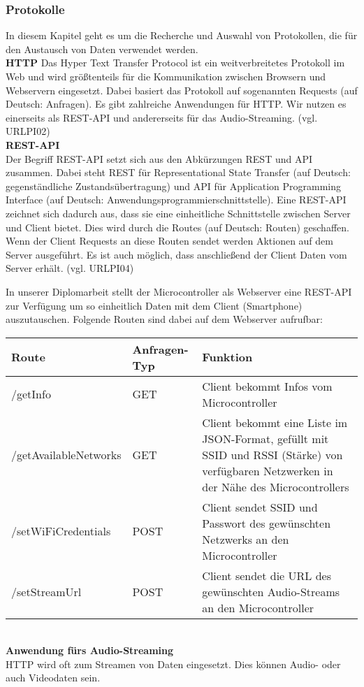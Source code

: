 \documentclass[]{article}
\begin{document}
\subsubsection{Protokolle}
In diesem Kapitel geht es um die Recherche und Auswahl von Protokollen, die für den Austausch von Daten verwendet werden.
\newline \\
\textbf{HTTP}
\newline
Das Hyper Text Transfer Protocol ist ein weitverbreitetes Protokoll im Web und wird größtenteils für die Kommunikation zwischen Browsern und Webservern eingesetzt. Dabei basiert das Protokoll auf sogenannten \glqq Requests\grqq{} (auf Deutsch: Anfragen). Es gibt zahlreiche Anwendungen für HTTP. Wir nutzen es einerseits als REST-API und andererseits für das Audio-Streaming. (vgl. URLPI02) \newline \\
\textbf{REST-API} \\ 
Der Begriff \glqq REST-API\grqq{} setzt sich aus den Abkürzungen \glqq REST\grqq{} und \glqq API\grqq{} zusammen. Dabei steht \glqq REST\grqq{} für \glqq Representational State Transfer\grqq{} (auf Deutsch: \glqq gegenständliche Zustandsübertragung\grqq{}) und \glqq API\grqq{} für \glqq Application Programming Interface\grqq{} (auf Deutsch: \glqq Anwendungsprogrammierschnittstelle\grqq{}). Eine REST-API zeichnet sich dadurch aus, dass sie eine einheitliche Schnittstelle zwischen Server und Client bietet. Dies wird durch die \glqq Routes\grqq{} (auf Deutsch: \glqq Routen\grqq{}) geschaffen. Wenn der Client Requests an diese Routen sendet werden Aktionen auf dem Server ausgeführt. Es ist auch möglich, dass anschließend der Client Daten vom Server erhält. (vgl. URLPI04)

In unserer Diplomarbeit stellt der Microcontroller als Webserver eine REST-API zur Verfügung um so einheitlich Daten mit dem Client (Smartphone) auszutauschen.
Folgende Routen sind dabei auf dem Webserver aufrufbar: \newline

\begin{tabularx}{\textwidth}{|l|l|X|}
\hline
\textbf{Route} & \textbf{Anfragen-Typ} & \textbf{Funktion} \\
\hline
/getInfo & GET & Client bekommt Infos vom Microcontroller \\
\hline 
/getAvailableNetworks & GET & Client bekommt eine Liste im JSON-Format, gefüllt mit SSID und RSSI (Stärke) von verfügbaren Netzwerken in der Nähe des Microcontrollers \\
\hline
/setWiFiCredentials & POST & Client sendet SSID und Passwort des gewünschten Netzwerks an den Microcontroller \\
\hline
/setStreamUrl & POST & Client sendet die URL des gewünschten Audio-Streams an den Microcontroller \\
\hline
\end{tabularx} \newline \\
\textbf{Anwendung fürs Audio-Streaming} \\
HTTP wird oft zum Streamen von Daten eingesetzt. Dies können Audio- oder auch Videodaten sein.
\end{document}
